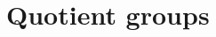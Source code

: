 \documentclass[preview]{standalone}
\begin{document}
\genpage

\section{Quotient groups}
\end{document}
